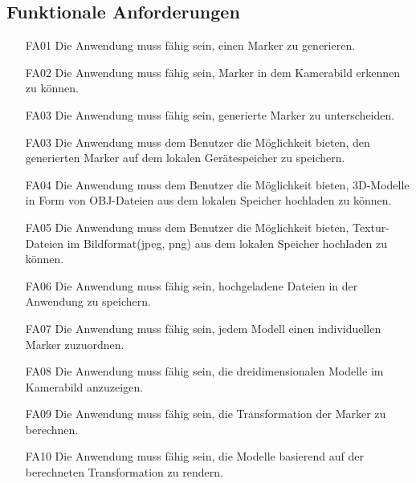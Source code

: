 \subsection{Funktionale Anforderungen}
\begin{itemize}
\item[FA01] Die Anwendung muss fähig sein, einen Marker zu generieren.
\item[FA02] Die Anwendung muss fähig sein, Marker in dem Kamerabild erkennen zu können.
\item[FA03] Die Anwendung muss fähig sein, generierte Marker zu unterscheiden.
\item[FA03] Die Anwendung muss dem Benutzer die Möglichkeit bieten, den generierten Marker auf dem lokalen Gerätespeicher zu speichern.
\item[FA04] Die Anwendung muss dem Benutzer die Möglichkeit bieten, 3D-Modelle in Form von OBJ-Dateien aus dem lokalen Speicher hochladen zu können.
\item[FA05] Die Anwendung muss dem Benutzer die Möglichkeit bieten, Textur-Dateien im Bildformat(jpeg, png) aus dem lokalen Speicher hochladen zu können.
\item[FA06] Die Anwendung muss fähig sein, hochgeladene Dateien in der Anwendung zu speichern.
\item[FA07] Die Anwendung muss fähig sein, jedem Modell einen individuellen Marker zuzuordnen.
\item[FA08] Die Anwendung muss fähig sein, die dreidimensionalen Modelle im Kamerabild anzuzeigen.
\item[FA09] Die Anwendung muss fähig sein, die Transformation der Marker zu berechnen.
\item[FA10] Die Anwendung muss fähig sein, die Modelle basierend auf der berechneten Transformation zu rendern.
\end{itemize}


